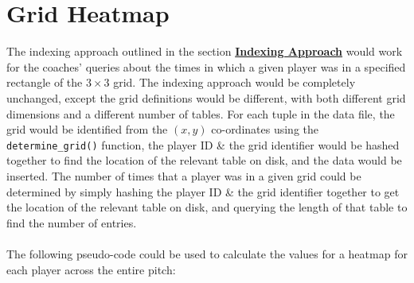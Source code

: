 \documentclass[a4paper,11pt]{article}
\begin{document}

\section{ Grid Heatmap}\label{sec:heatmap}
The indexing approach outlined in the section \textbf{\hyperref[sec:indexingapproach]{Indexing Approach}} would work for the coaches' queries about the times in which a given player was in a specified rectangle of the $3 \times 3$ grid.
The indexing approach would be completely unchanged, except the grid definitions would be different, with both different grid dimensions and a different number of tables. 
For each tuple in the data file, the grid would be identified from the $(x,y)$ co-ordinates using the \texttt{determine_grid()} function, the player ID \& the grid identifier would be hashed together to find the location of the relevant table on disk, and the data would be inserted. 
The number of times that a player was in a given grid could be determined by simply hashing the player ID \& the grid identifier together to get the location of the relevant table on disk, and querying the length of that table to find the number of entries. 
\\\\
The following pseudo-code could be used to calculate the values for a heatmap for each player across the entire pitch:
\end{document}
